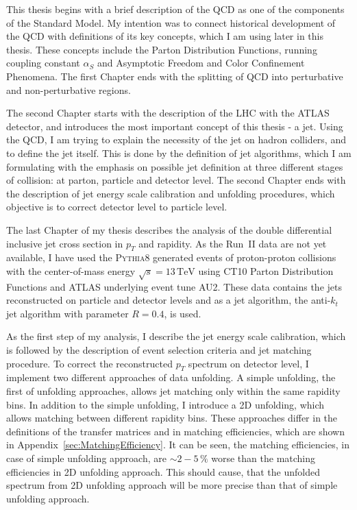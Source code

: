 \documentclass[a4paper,11pt,twoside,openright]{book}
\newcommand{\TeV}{\,\text{TeV}}
\newcommand{\pt}{p_{T}}
\begin{document}
This thesis begins with a brief description of the QCD as one of the components of
the Standard Model. My intention was to connect historical development of the QCD
with definitions of its key concepts, which I am using later in this thesis.
These concepts include the Parton Distribution Functions, running coupling
constant $\alpha_S$ and Asymptotic Freedom and Color Confinement Phenomena. The
first Chapter ends with the splitting of QCD into perturbative and
non-perturbative regions.

The second Chapter starts with the description of the LHC with the ATLAS
detector, and introduces the most important concept of this thesis - a jet. Using
the QCD, I am trying to explain the necessity of the jet on hadron colliders,
and to define the jet itself. This is done by the definition of jet algorithms,
which I am formulating with the emphasis on possible jet definition at three
different stages of collision: at parton, particle and detector level. The
second Chapter ends with the description of jet energy scale calibration and
unfolding procedures, which objective is to correct detector level to particle
level.

The last Chapter of my thesis describes the analysis of the double differential
inclusive jet cross section in $\pt$ and rapidity. As the Run~II data are
not yet available, I have used the \textsc{Pythia8} generated
events of proton-proton collisions with the center-of-mass energy $\sqrt{s}=13\TeV$ using
CT10 Parton Distribution Functions and ATLAS underlying event tune AU2. These
data contains the jets reconstructed on particle and detector levels and as a
jet algorithm, the anti-$k_t$ jet algorithm with parameter $R=0.4$, is used.

As the first step of my analysis, I describe the jet energy scale calibration,
which is followed by the description of event selection criteria and jet
matching procedure. To correct the reconstructed $\pt$ spectrum on detector
level, I implement two different approaches of data unfolding. A simple
unfolding, the first of unfolding approaches, allows jet matching only within
the same rapidity bins. In addition to the simple unfolding, I introduce a 2D
unfolding, which allows matching between different rapidity bins. These
approaches differ in the definitions of the transfer matrices and in matching
efficiencies, which are shown in Appendix~\ref{sec:MatchingEfficiency}.
It can be seen, the matching efficiencies, in case of simple unfolding approach, are $\sim
2-5\,\%$ worse than the matching efficiencies in 2D unfolding approach. This
should cause, that the unfolded spectrum from 2D unfolding approach will be more
precise than that of simple unfolding approach.
\end{document}
